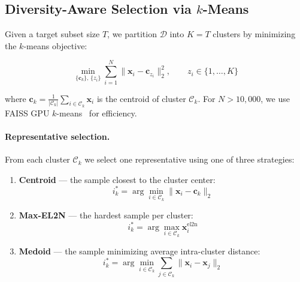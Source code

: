 \subsection{Diversity-Aware Selection via $k$-Means}
\label{sec:selection}

Given a target subset size $T$, we partition $\mathcal{D}$ into $K = T$
clusters by minimizing the $k$-means objective:

\begin{equation}
    \min_{\{\mathbf{c}_k\},\, \{z_i\}}
    \sum_{i=1}^{N} \|\mathbf{x}_i - \mathbf{c}_{z_i}\|_2^2,
    \qquad z_i \in \{1, \dots, K\}
\end{equation}

where $\mathbf{c}_k = \frac{1}{|\mathcal{C}_k|}\sum_{i \in \mathcal{C}_k} \mathbf{x}_i$
is the centroid of cluster $\mathcal{C}_k$.  For $N > 10{,}000$, we use
FAISS GPU $k$-means~\cite{johnson2019faiss} for efficiency.

\paragraph{Representative selection.}
From each cluster $\mathcal{C}_k$ we select one representative using one of
three strategies:

\begin{enumerate}
    \item \textbf{Centroid} --- the sample closest to the cluster center:
    \begin{equation}
        i_k^* = \arg\min_{i \in \mathcal{C}_k} \|\mathbf{x}_i - \mathbf{c}_k\|_2
    \end{equation}

    \item \textbf{Max-EL2N} --- the hardest sample per cluster:
    \begin{equation}
        i_k^* = \arg\max_{i \in \mathcal{C}_k} \mathbf{x}_i^{\text{el2n}}
    \end{equation}

    \item \textbf{Medoid} --- the sample minimizing average intra-cluster distance:
    \begin{equation}
        i_k^* = \arg\min_{i \in \mathcal{C}_k}
                \sum_{j \in \mathcal{C}_k} \|\mathbf{x}_i - \mathbf{x}_j\|_2
    \end{equation}
\end{enumerate}

